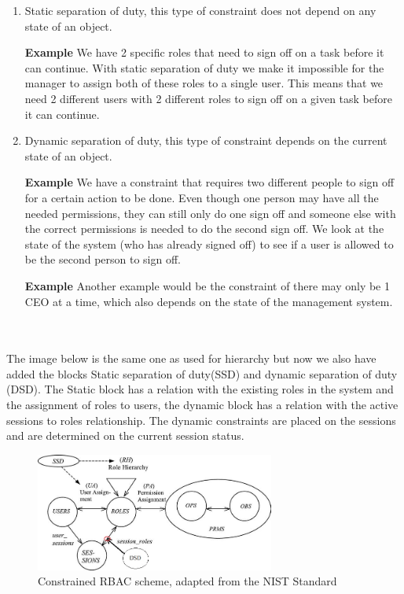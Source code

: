 \begin{enumerate}
    \item Static separation of duty, this type of constraint does not depend on any state of an object. 
    
    \textbf{Example} We have 2 specific roles that need to sign off on a task before it can continue.
    With static separation of duty we make it impossible for the manager to assign both of these roles to a single user. 
    This means that we need 2 different users with 2 different roles to sign off on a given task before it can continue.
    
    \item Dynamic separation of duty, this type of constraint depends on the current state of an object.
    
    \textbf{Example} We have a constraint that requires two different people to sign off for a certain action to be done. 
    Even though one person may have all the needed permissions, they can still only do one sign off and someone else with the correct permissions is needed to do the second sign off.
    We look at the state of the system (who has already signed off) to see if a user is allowed to be the second person to sign off.
    
    \textbf{Example} Another example would be the constraint of there may only be 1 CEO at a time, which also depends on the state of the management system.
\end{enumerate}
\\
\\
The image below is the same one as used for hierarchy but now we also have added the blocks Static separation of duty(SSD) and dynamic separation of duty (DSD).
The Static block has a relation with the existing roles in the system and the assignment of roles to users, the dynamic block has a relation with the active sessions to roles relationship.
The dynamic constraints are placed on the sessions and are determined on the current session status.

\begin{figure}[ht]
    \centering
    \includegraphics[width=0.7\textwidth, height=0.40\textwidth]{Img/standard/combinedConstraint.jpg}
    \caption{Constrained RBAC scheme, adapted from the NIST Standard \cite{Standard}}
\end{figure}

